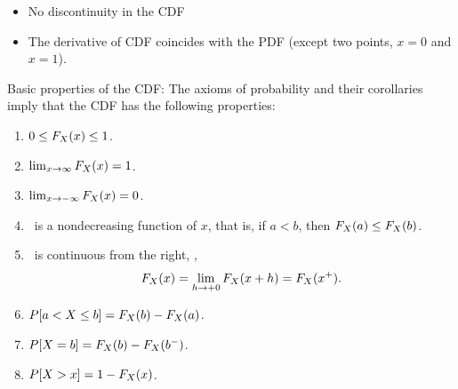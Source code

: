 	\begin{itemize}
		\item No discontinuity in the CDF
		\item The derivative of CDF coincides with the PDF (except two points, $x=0$ and $x=1$).
	\end{itemize}


	\item Basic properties of the CDF:
	The axioms of probability and their corollaries
	imply that the CDF has the following properties:

	\renewcommand{\labelenumi}{(\roman{enumi})}
	\renewcommand{\theenumi}{(\roman{enumi})}
	\begin{enumerate}
		\item \label{cdf-bp-1}
		$0\leq F_{X}(x) \leq 1$.

		\item \label{cdf-bp-2}
		$\lim_{x\to\infty} F_{X}(x) = 1$.

		\item \label{cdf-bp-3}
		$\lim_{x\to-\infty} F_{X}(x) = 0$.

		\item \label{cdf-bp-4}
		\ is a nondecreasing function of $x$,
		that is, if $a < b$, then $F_{X}(a) \leq F_{X}(b)$.

		\item \label{cdf-bp-5}
		\ is continuous from the right, \ie,
		\[
			F_{X}(x) = \lim_{h\to+0} F_{X}(x+h) = F_{X}(x^+).
		\]

		\item \label{cdf-bp-6}
		$P[a< X\leq b] = F_{X}(b) - F_{X}(a)$.

		\item \label{cdf-bp-7}
		$P[X=b] = F_{X}(b) - F_{X}(b^-)$.

		\item \label{cdf-bp-8}
		$P[X>x] = 1- F_{X}(x)$.

	\end{enumerate}

